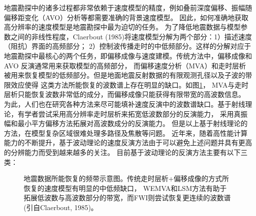 地震勘探中的诸多过程都非常依赖于速度模型的精度，例如叠前深度偏移、振幅随偏移距变化（AVO）分析等都需要准确的背景速度模型。
因此，如何准确地获取高分辨率的速度模型是地震勘探中最为迫切的任务。
为了降低地震数据与模型参数之间的非线性程度，Claerbout (1985)\cite{Claerbout1985Imaging}将速度模型分解为两个部分：1）描述速度（阻抗）界面的高频部分；
2）控制波传播走时的中低频部分。这样的分解对应于地震勘探中最核心的两个任务，即偏移成像与速度建模。传统方法中，偏移成像和AVO
反演通常用来获取模型的高频部分，
而偏移速度分析（MVA）和走时层析被用来恢复模型的低频部分。但是地面地震反射数据的有限观测孔径以及子波的带限效应使得
这类方法所能恢复的波数谱上存在明显的缺口。如图\ref{fig:GapInSeisVel}，
MVA与走时层析只能恢复波数非常低的成分，而偏移成像只能获得有限带宽的高波数信息。
为此，人们也在研究各种方法来尽可能填补速度反演中的波数谱缺口。基于射线理论，有学者尝试采用高分辨率走时层析来拓宽低波数部分的反演能力，
采用真振幅和最小平方偏移方法拓展对高波数成分的反演能力。
但是以上基于射线理论的方法，在模型复杂区域很难处理多路径及焦散等问题。
近年来，随着高性能计算能力的不断提升，基于波动理论的速度反演方法由于可以避免上述问题并具有更高的分辨能力而受到越来越多的关注。
目前基于波动理论的反演方法主要有以下三类：
\begin{figure}[t] 
   \centering 
   \caption{地震数据所能恢复的频带示意图。传统走时层析+偏移成像的方式所恢复的速度模型有明显的中低频缺口，
	   WEMVA和LSM方法有助于拓展低波数与高波数部分的带宽，而FWI则尝试恢复更连续的波数谱(引自Claerbout, 1985\cite{Claerbout1985Imaging})。}
   \label{fig:GapInSeisVel}
\end{figure}

